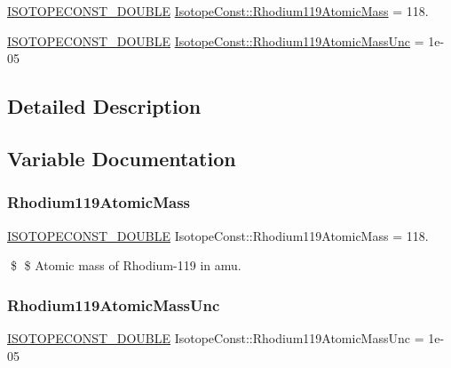 \begin{DoxyCompactItemize}
\item 
\mbox{\hyperlink{group___isotope_const-_macros_ga8f45a7272ce02c0b4c65c44636ed719a}{I\+S\+O\+T\+O\+P\+E\+C\+O\+N\+S\+T\+\_\+\+D\+O\+U\+B\+LE}} \mbox{\hyperlink{group___isotope_const-_rhodium-_rh119_gacdbcecf2a557fd624312bfefa91fd621}{Isotope\+Const\+::\+Rhodium119\+Atomic\+Mass}} = 118.
\item 
\mbox{\hyperlink{group___isotope_const-_macros_ga8f45a7272ce02c0b4c65c44636ed719a}{I\+S\+O\+T\+O\+P\+E\+C\+O\+N\+S\+T\+\_\+\+D\+O\+U\+B\+LE}} \mbox{\hyperlink{group___isotope_const-_rhodium-_rh119_ga8bd0a3e35470c648e1f0520da91b788d}{Isotope\+Const\+::\+Rhodium119\+Atomic\+Mass\+Unc}} = 1e-\/05
\end{DoxyCompactItemize}


\subsection{Detailed Description}


\subsection{Variable Documentation}
\mbox{\label{group___isotope_const-_rhodium-_rh119_gacdbcecf2a557fd624312bfefa91fd621}} 
\subsubsection{\texorpdfstring{Rhodium119\+Atomic\+Mass}{Rhodium119AtomicMass}}
{\footnotesize\ttfamily \mbox{\hyperlink{group___isotope_const-_macros_ga8f45a7272ce02c0b4c65c44636ed719a}{I\+S\+O\+T\+O\+P\+E\+C\+O\+N\+S\+T\+\_\+\+D\+O\+U\+B\+LE}} Isotope\+Const\+::\+Rhodium119\+Atomic\+Mass = 118.}

\$ \$ Atomic mass of Rhodium-\/119 in amu. \mbox{\label{group___isotope_const-_rhodium-_rh119_ga8bd0a3e35470c648e1f0520da91b788d}} 
\subsubsection{\texorpdfstring{Rhodium119\+Atomic\+Mass\+Unc}{Rhodium119AtomicMassUnc}}
{\footnotesize\ttfamily \mbox{\hyperlink{group___isotope_const-_macros_ga8f45a7272ce02c0b4c65c44636ed719a}{I\+S\+O\+T\+O\+P\+E\+C\+O\+N\+S\+T\+\_\+\+D\+O\+U\+B\+LE}} Isotope\+Const\+::\+Rhodium119\+Atomic\+Mass\+Unc = 1e-\/05}

